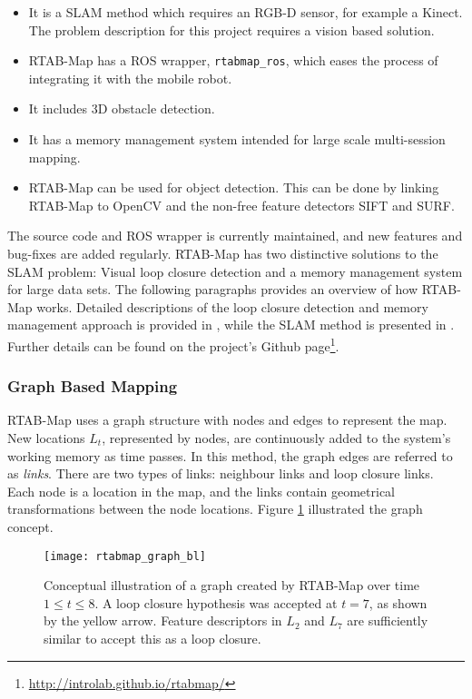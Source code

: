 \begin{itemize}
	\item It is a \ac{SLAM} method which requires an RGB-D sensor, for example a Kinect. The problem description for this project requires a vision based solution.
	\item \ac{RTAB-Map} has a \ac{ROS} wrapper, \texttt{rtabmap\_ros}, which eases the process of integrating it with the mobile robot.
	\item It includes 3D obstacle detection.
	\item It has a memory management system intended for large scale multi-session mapping.
	\item \ac{RTAB-Map} can be used for object detection. This can be done by linking \ac{RTAB-Map} to OpenCV and the non-free feature detectors \ac{SIFT} and \ac{SURF}.
\end{itemize}

The source code and \ac{ROS} wrapper is currently maintained, and new features and bug-fixes are added regularly. \ac{RTAB-Map} has two distinctive solutions to the \ac{SLAM} problem: Visual loop closure detection and a memory management system for large data sets. The following paragraphs provides an overview of how \ac{RTAB-Map} works. Detailed descriptions of the loop closure detection and memory management approach is provided in  \cite{labbe13appearance}, while the \ac{SLAM} method is presented in \cite{labbe14online}. Further details can be found on the project's Github page\footnote{\url{http://introlab.github.io/rtabmap/}}.

\subsubsection{Graph Based Mapping}

\ac{RTAB-Map} uses a graph structure with nodes and edges to represent the map. New locations $L_t$, represented by nodes, are continuously added to the system's working memory as time passes. In this method, the graph edges are referred to as \textit{links}. There are two types of links: neighbour links and loop closure links. Each node is a location in the map, and the links contain geometrical transformations between the node locations. Figure \ref{fig:rtabmap_graph} illustrated the graph concept.

\begin{figure}[h]
    \centering
    \texttt{[image: rtabmap\_graph\_bl]}
    \caption{Conceptual illustration of a graph created by \ac{RTAB-Map} over time $1 \leq t \leq 8 $. A loop closure hypothesis was accepted at $t=7$, as shown by the yellow arrow. Feature descriptors in $L_2$ and $L_7$ are sufficiently similar to accept this as a loop closure.}
    \label{fig:rtabmap_graph}
\end{figure}

